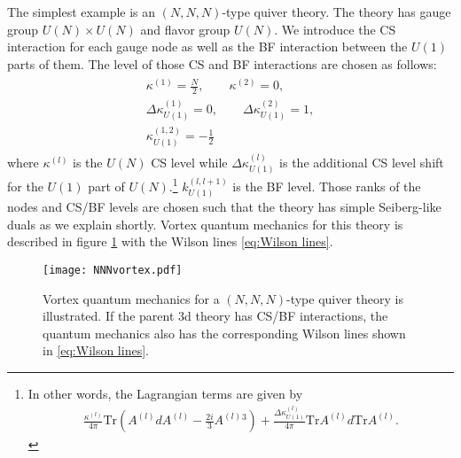 \documentclass[a4paper,11pt]{article}
\begin{document}
The simplest example is an $(N,N,N)$-type quiver theory. The theory has gauge group $U(N) \times U(N)$ and flavor group $U(N)$. We introduce the CS interaction for each gauge node as well as the BF interaction between the $U(1)$ parts of them. The level of those CS and BF interactions are chosen as follows:
\begin{gather}
\begin{gathered}
\label{eq:NNN CS}
\kappa^{(1)} = \frac{N}{2}, \qquad \kappa^{(2)} = 0, \\
\Delta \kappa_{U(1)}^{(1)} = 0, \qquad \Delta \kappa_{U(1)}^{(2)} = 1, \\
\kappa_{U(1)}^{(1,2)} = -\frac{1}{2}
\end{gathered}
\end{gather}
where $\kappa^{(l)}$ is the $U(N)$ CS level while $\Delta \kappa_{U(1)}^{(l)}$ is the additional CS level shift for the $U(1)$ part of $U(N)$.\footnote{In other words, the Lagrangian terms are given by 
\begin{align}
\frac{\kappa^{(l)}}{4 \pi} \mathrm{Tr} \left(A^{(l)} d A^{(l)}-\frac{2 i}{3} A^{(l)}{}^3\right)+\frac{\Delta \kappa_{U(1)}^{(l)}}{4 \pi} \mathrm{Tr} A^{(l)} d \mathrm{Tr} A^{(l)}.
\end{align}
} $k_{U(1)}^{(l,l+1)}$ is the BF level. Those ranks of the nodes and CS/BF levels are chosen such that the theory has simple Seiberg-like duals as we explain shortly. Vortex quantum mechanics for this theory is described in figure \ref{fig:NNN vortex} with the Wilson lines \eqref{eq:Wilson lines}.
%
\begin{figure}[tbp]
\centering %
\texttt{[image: NNNvortex.pdf]}
\caption{\label{fig:NNN vortex} Vortex quantum mechanics for a $(N,N,N)$-type quiver theory is illustrated. If the parent 3d theory has CS/BF interactions, the quantum mechanics also has the corresponding Wilson lines shown in \eqref{eq:Wilson lines}.}
\end{figure}
%
\end{document}
